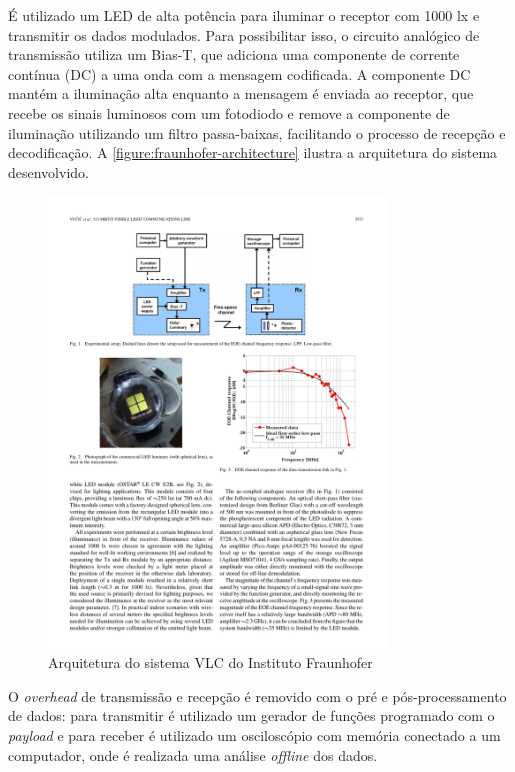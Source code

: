 	É utilizado um LED de alta potência para iluminar o receptor com 1000 lx e transmitir os dados modulados. Para possibilitar isso, o circuito analógico de transmissão utiliza um Bias-T, que adiciona uma componente de corrente contínua (DC) a uma onda com a mensagem codificada. A componente DC mantém a iluminação alta enquanto a mensagem é enviada ao receptor, que recebe os sinais luminosos com um fotodiodo e remove a componente de iluminação utilizando um filtro passa-baixas, facilitando o processo de recepção e decodificação. A \autoref{figure:fraunhofer-architecture} ilustra a arquitetura do sistema desenvolvido.
	
	\begin{figure}[h]
		\caption{\label{figure:fraunhofer-architecture}Arquitetura do sistema VLC do Instituto Fraunhofer}
		\centering
		\includegraphics[width=0.8\textwidth, trim={5cm 19.3cm 4.5cm 2cm},clip]{fraunhofer2.pdf}
	\end{figure}
	
	O \textit{overhead} de transmissão e recepção é removido com o pré e pós-processamento de dados: para transmitir é utilizado um gerador de funções programado com o \textit{payload} e para receber é utilizado um osciloscópio com memória conectado a um computador, onde é realizada uma análise \textit{offline} dos dados.	
	

